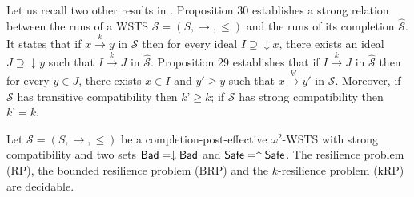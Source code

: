 Let us recall two other results in \cite{BFM-ic17}. Proposition 30 establishes a strong relation between the runs of a WSTS $\mathscr{S}=(S,\rightarrow, \leq)$ and the runs of its completion $\hat{\mathscr{S}}$. It states that if $x \xrightarrow{k} y$ in $\mathscr{S}$ then for every ideal $I \supseteq \downarrow x$, there exists an ideal $J \supseteq \downarrow y$ such that $I \xrightarrow{k} J$ in $\hat{\mathscr{S}}$. Proposition 29 establishes that if $I \xrightarrow{k} J$ in $\hat{\mathscr{S}}$ then for every $y \in J$, there exists $x \in I$ and $y' \geq y$ such that $x \xrightarrow{k'} y'$ in $\mathscr{S}$. Moreover, if $\mathscr{S}$ has transitive compatibility then $k’ \geq k$; if $\mathscr{S}$ has strong compatibility then $k’ = k$.
%





%
\begin{theorem}\label{down-up}
Let $\mathscr{S}=(S,\rightarrow, \leq)$ be a completion-post-effective $\omega^2$-WSTS with strong compatibility and two 
 sets $\textsf{Bad} = \downarrow \textsf{Bad}$ and $\textsf{Safe} = \uparrow \textsf{Safe}$.
The resilience problem (RP), the bounded resilience problem (BRP)
and the $k$-resilience problem (kRP) are decidable.
\end{theorem}

